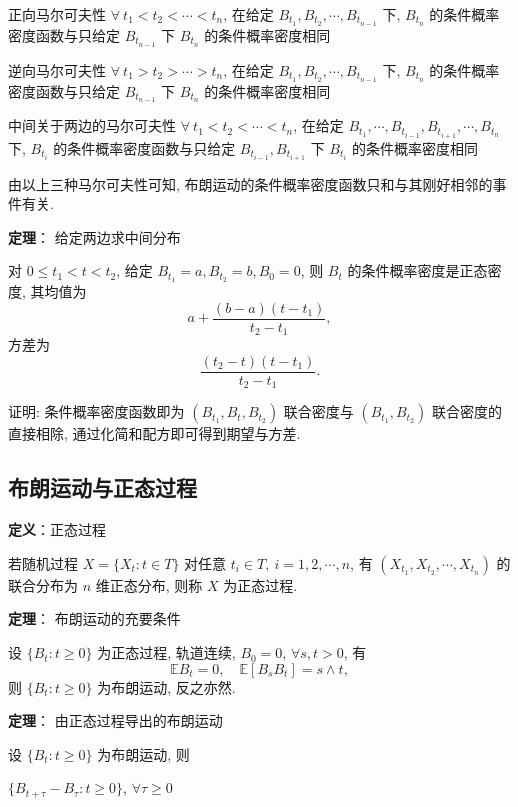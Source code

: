 \documentclass[openany]{ctexbook}
\theoremstyle{kaiti}
\theoremstyle{normal}
\begin{document}
正向马尔可夫性
$\forall~t_1<t_2<\cdots<t_n$, 在给定 $B_{t_1},B_{t_2},\cdots,B_{t_{n-1}}$ 下, $B_{t_n}$ 的条件概率密度函数与只给定 $B_{t_{n-1}}$ 下 $B_{t_n}$ 的条件概率密度相同

逆向马尔可夫性
$\forall~t_1>t_2>\cdots>t_n$, 在给定 $B_{t_1},B_{t_2},\cdots,B_{t_{n-1}}$ 下, $B_{t_n}$ 的条件概率密度函数与只给定 $B_{t_{n-1}}$ 下 $B_{t_n}$ 的条件概率密度相同

中间关于两边的马尔可夫性
$\forall~t_1<t_2<\cdots<t_n$, 在给定 $B_{t_1},\cdots,B_{t_{i-1}},B_{t_{i+1}},\cdots,B_{t_{n}}$ 下, $B_{t_i}$ 的条件概率密度函数与只给定 $B_{t_{i-1}},B_{t_{i+1}}$ 下 $B_{t_i}$ 的条件概率密度相同

由以上三种马尔可夫性可知, 布朗运动的条件概率密度函数只和与其刚好相邻的事件有关.

\textbf{定理}： 给定两边求中间分布

对 $0\leqslant t_1<t<t_2$, 给定 $B_{t_1}=a,B_{t_2}=b,B_0=0$, 则 $B_t$ 的条件概率密度是正态密度, 其均值为
\begin{equation}
  a+\frac{(b-a)(t-t_1)}{t_2-t_1},
\end{equation}
方差为
\begin{equation}
  \frac{(t_2-t)(t-t_1)}{t_2-t_1}.
\end{equation}

证明: 条件概率密度函数即为 $(B_{t_1},B_t,B_{t_2})$ 联合密度与 $(B_{t_1},B_{t_2})$ 联合密度的直接相除, 通过化简和配方即可得到期望与方差.

\subsection{布朗运动与正态过程}

\textbf{定义}：正态过程

若随机过程 $X=\{X_t:t\in T\}$ 对任意 $t_i\in T,~i=1,2,\cdots,n$, 有 $(X_{t_1},X_{t_2},\cdots,X_{t_n})$ 的联合分布为 $n$ 维正态分布, 则称 $X$ 为正态过程.

\textbf{定理}： 布朗运动的充要条件

设 $\{B_t:t\geqslant0\}$ 为正态过程, 轨道连续, $B_0=0$, $\forall s,t>0$, 有
\begin{equation}
  \mathbb{E}B_t=0,\quad \mathbb{E}[B_sB_t]=s\wedge t,
\end{equation}
则 $\{B_t:t\geqslant0\}$ 为布朗运动, 反之亦然.

\textbf{定理}： 由正态过程导出的布朗运动

设 $\{B_t:t\geqslant0\}$ 为布朗运动, 则

$\{B_{t+\tau}-B_\tau:t\geqslant0\}$, $\forall \tau\geqslant0$
\end{document}

